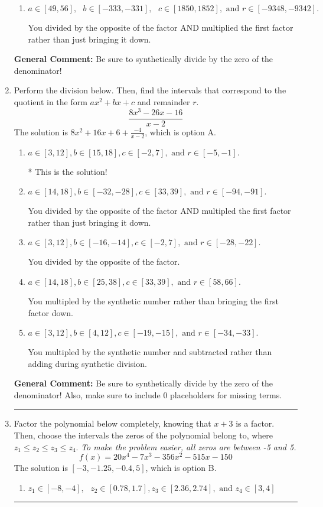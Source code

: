 \documentclass{extbook}[14pt]
\newcommand{\litem}[1]{\item #1

\rule{\textwidth}{0.4pt}}
\begin{document}
\begin{enumerate}
{\begin{enumerate}[label=\Alph*.]
 You divided by the opposite of the factor.
\item \( a \in [49, 56], \text{   } b \in [-333, -331], \text{   } c \in [1850, 1852], \text{   and   } r \in [-9348, -9342]. \)

 You divided by the opposite of the factor AND multiplied the first factor rather than just bringing it down.
\end{enumerate}

\textbf{General Comment:} Be sure to synthetically divide by the zero of the denominator!
}
\litem{
Perform the division below. Then, find the intervals that correspond to the quotient in the form $ax^2+bx+c$ and remainder $r$.
\[ \frac{8x^{3} -26 x -16}{x -2} \]The solution is \( 8x^{2} +16 x + 6 + \frac{-4}{x -2} \), which is option A.\begin{enumerate}[label=\Alph*.]
\item \( a \in [3, 12], b \in [15, 18], c \in [-2, 7], \text{ and } r \in [-5, -1]. \)

* This is the solution!
\item \( a \in [14, 18], b \in [-32, -28], c \in [33, 39], \text{ and } r \in [-94, -91]. \)

 You divided by the opposite of the factor AND multipled the first factor rather than just bringing it down.
\item \( a \in [3, 12], b \in [-16, -14], c \in [-2, 7], \text{ and } r \in [-28, -22]. \)

 You divided by the opposite of the factor.
\item \( a \in [14, 18], b \in [25, 38], c \in [33, 39], \text{ and } r \in [58, 66]. \)

 You multipled by the synthetic number rather than bringing the first factor down.
\item \( a \in [3, 12], b \in [4, 12], c \in [-19, -15], \text{ and } r \in [-34, -33]. \)

 You multipled by the synthetic number and subtracted rather than adding during synthetic division.
\end{enumerate}

\textbf{General Comment:} Be sure to synthetically divide by the zero of the denominator! Also, make sure to include 0 placeholders for missing terms.
}
\litem{
Factor the polynomial below completely, knowing that $x + 3$ is a factor. Then, choose the intervals the zeros of the polynomial belong to, where $z_1 \leq z_2 \leq z_3 \leq z_4$. \textit{To make the problem easier, all zeros are between -5 and 5.}
\[ f(x) = 20x^{4} -7 x^{3} -356 x^{2} -515 x -150 \]The solution is \( [-3, -1.25, -0.4, 5] \), which is option B.\begin{enumerate}[label=\Alph*.]
\item \( z_1 \in [-8, -4], \text{   }  z_2 \in [0.78, 1.7], z_3 \in [2.36, 2.74], \text{   and   } z_4 \in [3, 4] \)


\end{enumerate}}
\end{enumerate}
\end{document}
